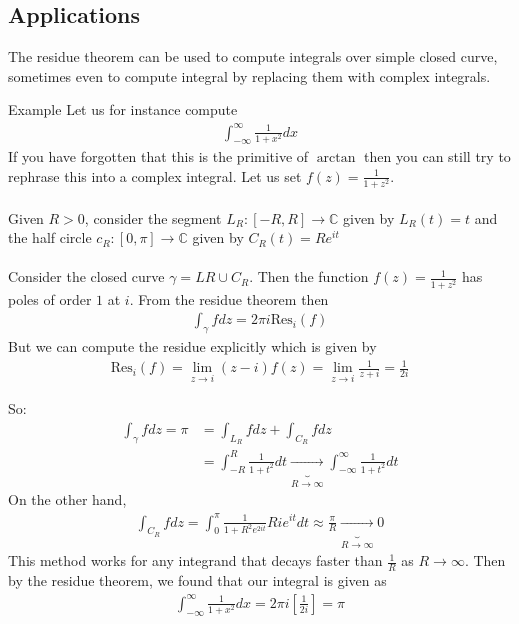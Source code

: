 \subsection{Applications}

The residue theorem can be used to compute integrals over simple closed curve, sometimes even to compute  integral by replacing them with complex integrals.


\begin{parag}{Example}
	Let us for instance compute 
	\begin{align*} 
		\int_{-\infty}^{\infty} \frac{1}{1 + x^2} dx
	\end{align*}
	If you have forgotten that this is the primitive of $\arctan$ then you can still try to rephrase this into a complex integral. Let us set $f\left(z\right) =  \frac{1}{1 + z^2}$.\\
	$ $\\
	Given $R > 0$, consider the segment $L_R: \left[-R, R\right] \to \mathbb{C}$ given by $L_R\left(t\right) = t$ and the half circle $c_R : \left[0, \pi\right] \to \mathbb{C}$ given by $C_R\left(t\right) =  Re^{it}$\\
	$ $\\
	Consider the closed curve $\gamma = LR \cup C_R$. Then the function $f\left(z\right) = \frac{1}{1 + z^2}$ has poles of order $1$ at $i$. From the residue theorem then 
	\begin{align*} 
		\int_{\gamma} fdz =  2\pi i \text{Res}_i \left(f\right)
	\end{align*}
	But we can compute the residue explicitly which is given by 
	\begin{align*} \text{Res}_i\left(f\right) =  \lim_{z  \to i} \left(z - i\right)f\left(z\right) =  \lim_{z \to i} \frac{1}{z + i} = \frac{1}{2i} \end{align*}


	So:
	\begin{align*} 
		\int_{\gamma} fdz =  \pi &=  \int_{L_R}fdz + \int_{C_R}fdz\\
		&= \int_{-R}^{R} \frac{1}{1 + t^2}dt \underbrace{\to}_{R \to \infty} \int_{-\infty}^{\infty}\frac{1}{1 + t^2}dt
	\end{align*}
	On the other hand, 
	\begin{align*} 
		\int_{C_R}fdz =  \int_0^{\pi} \frac{1}{1 + R^2e^{2it}}Rie^{it}dt \approx \frac{\pi}{R} \underbrace{\to}_{R \to \infty} 0
	\end{align*}
	This method works for any integrand that decays faster than $\frac{1}{R}$ as $R \to \infty$. Then by the residue theorem, we found that our integral is given as 
	\begin{align*} 
		\int_{-\infty}^{\infty}\frac{1}{1 + x^2}dx = 2 \pi i \left[\frac{1}{2i}\right] = \pi
	\end{align*}
\end{parag}

